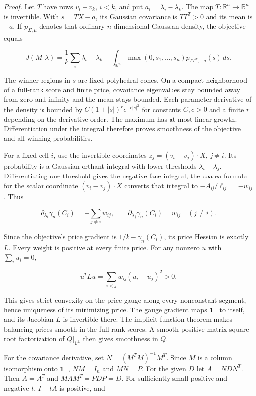 \documentclass[11pt]{article}
\begin{document}
\emph{Proof.} Let \(T\) have rows \(v_i-v_k\), \(i<k\), and put
\(a_i=\lambda_i-\lambda_k\). The map \(T:\mathbb R^n\to\mathbb R^n\) is
invertible. With \(s=TX-a\), its Gaussian covariance is \(TT^T>0\) and
its mean is \(-a\). If \(p_{\Sigma,\mu}\) denotes that ordinary
\(n\)-dimensional Gaussian density, the objective equals

\[
 J(M,\lambda)=\frac1k\sum_i\lambda_i-\lambda_k+
 \int_{\mathbb R^n}\max(0,s_1,\ldots,s_n)
                      p_{TT^T,-a}(s)\,ds.                 \tag{8a}
\]

The winner regions in \(s\) are fixed polyhedral cones. On a compact
neighborhood of a full-rank score and finite price, covariance
eigenvalues stay bounded away from zero and infinity and the mean stays
bounded. Each parameter derivative of the density is bounded by
\(C(1+|s|)^r e^{-c|s|^2}\) for constants \(C,c>0\) and a finite \(r\)
depending on the derivative order. The maximum has at most linear
growth. Differentiation under the integral therefore proves smoothness
of the objective and all winning probabilities.

For a fixed cell \(i\), use the invertible coordinates
\(z_j=(v_i-v_j)\cdot X\), \(j\ne i\). Its probability is a Gaussian
orthant integral with lower thresholds \(\lambda_i-\lambda_j\).
Differentiating one threshold gives the negative face integral; the
coarea formula for the scalar coordinate \((v_i-v_j)\cdot X\) converts
that integral to \(-A_{ij}/\ell_{ij}=-w_{ij}\). Thus

\[
 \partial_{\lambda_i}\gamma_n(C_i)=-\sum_{j\ne i}w_{ij},
 \qquad
 \partial_{\lambda_j}\gamma_n(C_i)=w_{ij}\quad(j\ne i).
                                                               \tag{8b}
\]

Since the objective's price gradient is \(1/k-\gamma_n(C_i)\), its price
Hessian is exactly \(L\). Every weight is positive at every finite
price. For any nonzero \(u\) with \(\sum_i u_i=0\),

\[
 u^TLu=\sum_{i<j}w_{ij}(u_i-u_j)^2>0.
\]

This gives strict convexity on the price gauge along every nonconstant
segment, hence uniqueness of its minimizing price. The gauge gradient
maps \(\mathbf1^\perp\) to itself, and its Jacobian \(L\) is invertible
there. The implicit function theorem makes balancing prices smooth in
the full-rank scores. A smooth positive matrix square-root factorization
of \(Q|_{\mathbf1^\perp}\) then gives smoothness in \(Q\).

For the covariance derivative, set \(N=(M^TM)^{-1}M^T\). Since \(M\) is
a column isomorphism onto \(\mathbf1^\perp\), \(NM=I_n\) and \(MN=P\).
For the given \(D\) let \(A=NDN^T\). Then \(A=A^T\) and \(MAM^T=PDP=D\).
For sufficiently small positive and negative \(t\), \(I+tA\) is
positive, and
\end{document}
